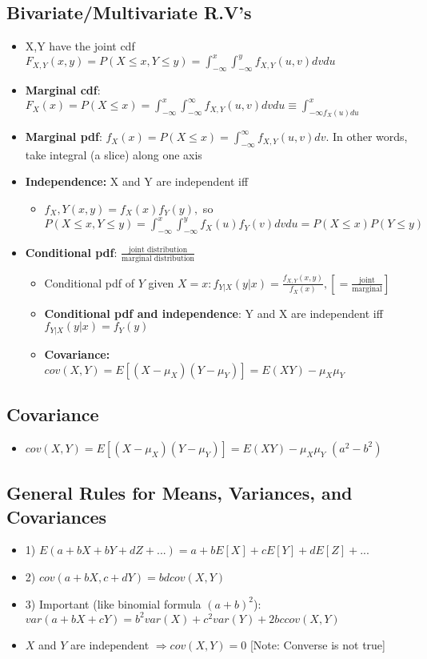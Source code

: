 \documentclass[10pt, oneside]{article}
\begin{document}
\subsection{Bivariate/Multivariate R.V's}
\begin{itemize}
    \item X,Y have the joint cdf $F_{X,Y}(x,y)=P(X\leq x, Y\leq y)=\int^{x}_{-\infty}\int^{y}_{-\infty} f_{X,Y} (u,v) dvdu$
    \item \textbf{Marginal cdf}: $F_X(x) =P(X\leq x)=\int _{-\infty} ^ x\int^{\infty}_{-\infty} f_{X,Y}(u,v)dvdu\equiv \int^{x}_{-\infty f_X(u)du}$
    \item \textbf{Marginal pdf}: $f_X(x) =P(X\leq x)=\int _{-\infty} ^ {\infty} f_{X,Y}(u,v)dv$. In other words, take integral (a slice) along one axis
    \item \textbf{Independence:} X and Y are independent iff
    \begin{itemize}
        \item $f_X,Y (x,y)=f_X(x) f_Y(y), $ so \\
        $P(X\leq x, Y\leq y) = \int^{x}_{-\infty}\int^{y}_{-\infty} f_X(u)f_Y(v) dvdu=P(X\leq x)P(Y\leq y)$
    \end{itemize}
    \item \textbf{Conditional pdf}: $\frac{\text{joint distribution}}{\text{marginal distribution}}$
    \begin{itemize}
        \item Conditional pdf of $Y$ given $X=x:f_{Y|X}(y|x) =\frac{f_{X,Y} (x,y)}{f_X (x)}, [=\frac{\text{joint}}{\text{marginal}}]$
        \item \textbf{Conditional pdf and independence}: Y and X are independent iff $f_{Y|X} (y|x) =f_Y (y)$
        \item \textbf{Covariance:} $cov(X,Y)=E[(X-\mu_X)(Y-\mu_Y)]=E(XY)-\mu_X\mu_Y$
    \end{itemize}
\end{itemize}
\subsection{Covariance}
\begin{itemize}
    \item $cov(X,Y)=E[(X-\mu_X)(Y-\mu_Y)]=E(XY)-\mu_X\mu_Y$ $(a^2-b^2)$
\end{itemize}

\subsection{General Rules for Means, Variances, and Covariances}
\begin{itemize}
    \item 1) $E(a+bX+bY+dZ+...)=a+bE[X]+cE[Y]+dE[Z]+...$
    \item 2) $cov(a+bX, c+dY)=bdcov(X,Y)$
    \item 3) Important (like binomial formula $(a+b)^2$): $var(a+bX+cY)=b^2 var(X)+ c^2 var(Y)+2bccov(X,Y)$
    \item $X$ and $Y$ are independent $\Rightarrow cov(X,Y)=0$ [Note: Converse is not true]
\end{itemize}
\end{document}
